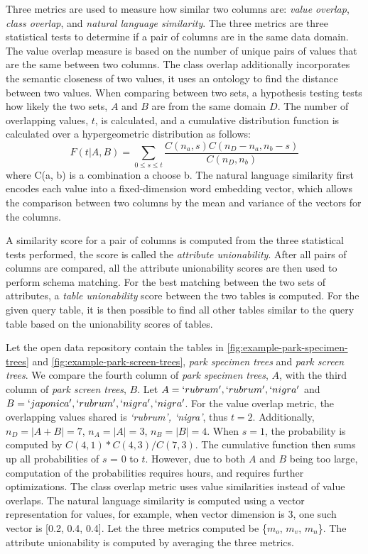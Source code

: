 Three metrics are used to measure how similar two columns are: \textit{value overlap}, \textit{class overlap}, and \textit{natural language similarity}. The three metrics are three statistical tests to determine if a pair of columns are in the same data domain. The value overlap measure is based on the number of unique pairs of values that are the same between two columns. The class overlap additionally incorporates the semantic closeness of two values, it uses an ontology to find the distance between two values. When comparing between two sets, a hypothesis testing tests how likely the two sets, $A$ and $B$ are from the same domain $D$. The number of overlapping values, $t$, is calculated, and a cumulative distribution function is calculated over a hypergeometric distribution as follows:
\[
F(t|A,B) = \sum\limits _{0\le s\le t}\frac{C(n_{a},s)C(n_{D}-n_{a},n_{b}-s)}{C(n_{D},n_{b})}
\]
where C(a, b) is a combination a choose b. The natural language similarity first encodes each value into a fixed-dimension word embedding vector, which allows the comparison between two columns by the mean and variance of the vectors for the columns.

A similarity score for a pair of columns is computed from the three statistical tests performed, the score is called the \textit{attribute unionability}. After all pairs of columns are compared, all the attribute unionability scores are then used to perform schema matching. For the best matching between the two sets of attributes, a \textit{table unionability} score between the two tables is computed. For the given query table, it is then possible to find all other tables similar to the query table based on the unionability scores of tables.

Let the open data repository contain the tables in \autoref{fig:example-park-specimen-trees} and \autoref{fig:example-park-screen-trees}, \textit{park specimen trees} and \textit{park screen trees}. We compare the fourth column of \textit{park specimen trees}, $A$, with the third column of \textit{park screen trees}, $B$. Let $A={`rubrum', `rubrum', `nigra'}$ and $B={`japonica', `rubrum', `nigra', `nigra'}$. For the value overlap metric, the overlapping values shared is \textit{{`rubrum', `nigra'}}, thus $t=2$. Additionally, $n_D=|A+B|=7$, $n_A=|A|=3$, $n_B=|B|=4$. When $s=1$, the probability is computed by $C(4, 1) * C(4, 3) / C(7, 3)$. The cumulative function then sums up all probabilities of $s$ = 0 to $t$. However, due to both $A$ and $B$ being too large, computation of the probabilities requires hours, and requires further optimizations. The class overlap metric uses value similarities instead of value overlaps. The natural language similarity is computed using a vector representation for values, for example, when vector dimension is 3, one such vector is [0.2, 0.4, 0.4]. Let the three metrics computed be \{$m_o$, $m_v$, $m_n$\}. The attribute unionability is computed by averaging the three metrics.

